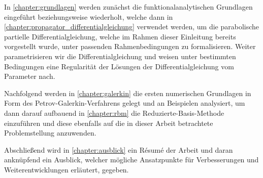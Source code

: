 \documentclass[../main.tex]{subfiles}
\begin{document}
In \cref{chapter:grundlagen} werden zunächst die funktionalanalytischen Grundlagen eingeführt beziehungsweise wiederholt, welche dann in \cref{chapter:propagator_differentialgleichung} verwendet werden, um die parabolische partielle Differentialgleichung, welche im Rahmen dieser Einleitung bereits vorgestellt wurde, unter passenden Rahmenbedingungen zu formalisieren.
Weiter parametrisieren wir die Differentialgleichung und weisen unter bestimmten Bedingungen eine Regularität der Lösungen der Differentialgleichung vom Parameter nach.

Nachfolgend werden in \cref{chapter:galerkin} die ersten numerischen Grundlagen in Form des Petrov-Galerkin-Verfahrens gelegt und an Beispielen analysiert, um dann darauf aufbauend in \cref{chapter:rbm} die Reduzierte-Basis-Methode einzuführen und diese ebenfalls auf die in dieser Arbeit betrachtete Problemstellung anzuwenden.

Abschließend wird in \cref{chapter:ausblick} ein Résumé der Arbeit und daran anknüpfend ein Ausblick, welcher mögliche Ansatzpunkte für Verbesserungen und Weiterentwicklungen erläutert, gegeben.
\end{document}

